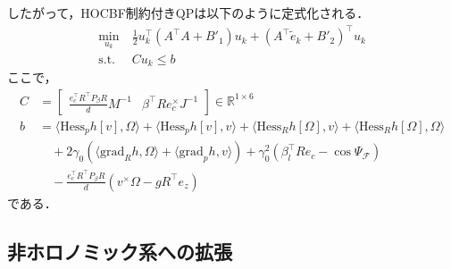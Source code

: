 したがって，HOCBF制約付きQPは以下のように定式化される．
\begin{equation}
\begin{aligned}
\min_{u_k} &\: \frac{1}{2} u_k^\top (A^\top A + B'_1) u_k + (A^\top \tilde{e}_k + B'_2)^\top u_k \\
\mathrm{s.t.} &\: C u_k \leq b
\label{eq:hocbf_qp}
\end{aligned}
\end{equation}
ここで，
\begin{equation}
\begin{aligned}
C &= \begin{bmatrix} \frac{e_c^\top R^\top P_\beta R}{d} M^{-1} & \beta^\top R e_c^\times J^{-1} \end{bmatrix} \in \mathbb{R}^{1 \times 6} \\
b &= \langle \mathrm{Hess}_p h[v], \Omega \rangle + \langle \mathrm{Hess}_p h[v], v \rangle + \langle \mathrm{Hess}_R h[\Omega], v \rangle + \langle \mathrm{Hess}_R h[\Omega], \Omega \rangle \\
&\quad + 2 \gamma_0 (\langle \mathrm{grad}_R h, \Omega \rangle + \langle \mathrm{grad}_p h, v \rangle) + \gamma_0^2 (\beta_l^{\top} R e_c - \cos \Psi_\mathcal{F}) \\
&\quad - \frac{e_c^\top R^\top P_\beta R}{d} (v^\times \Omega - g R^\top e_z)
\label{eq:hocbf_qp_parameters}
\end{aligned}
\end{equation}
である．

\subsection{非ホロノミック系への拡張}

